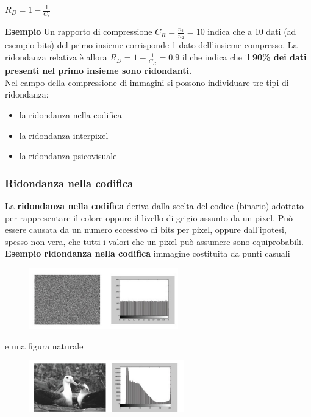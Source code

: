 \begin{center}
    $R_D = 1 - \frac{1}{C_r}$
\end{center}

\textbf{Esempio}
Un rapporto di compressione $C_R = \frac{n_1}{n_2} = 10$ indica che a 10 dati (ad esempio bits) del primo insieme corrisponde 1 dato dell'insieme compresso.
La ridondanza relativa è allora $R_D = 1 - \frac{1}{C_R} = 0.9$ il che indica che il \textbf{90\%  dei dati presenti nel primo insieme sono ridondanti.}
\\Nel campo della compressione di immagini si possono individuare
tre tipi di ridondanza:
\begin{itemize}
    \item la ridondanza nella codifica
    \item la ridondanza interpixel
    \item la ridondanza psicovisuale
\end{itemize}

\subsubsection{Ridondanza nella codifica}
La \textbf{ridondanza nella codifica} deriva dalla scelta del codice (binario) adottato per rappresentare il colore oppure il livello di grigio
assunto da un pixel. Può essere causata da un numero eccessivo di bits per pixel, oppure dall'ipotesi, spesso non vera, che tutti i valori che un pixel può assumere sono equiprobabili.
\textbf{Esempio ridondanza nella codifica}
immagine costituita da punti casuali

\begin{figure}[H]
    \centering
    \includegraphics[width=\linewidth, keepaspectratio]{capitoli/immagini/imgs/ridondanza-codifica.png}
\end{figure}

e una figura naturale

\begin{figure}[H]
    \centering
    \includegraphics[width=\linewidth, keepaspectratio]{capitoli/immagini/imgs/ridondanza-codifica2.png}
\end{figure}

